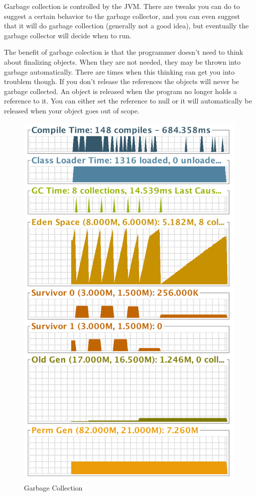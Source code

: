 Garbage collection is controlled by the JVM. There are tweaks you can do to suggest a certain behavior to the garbage collector, and you can even suggest that it will do garbage collection (generally not a good idea), but eventually the garbage collector will decide when to run.

The benefit of garbage colection is that the programmer doesn't need to think about finalizing objects. When they are not needed, they may be thrown into garbage automatically. There are times when this thinking can get you into troublem though. If you don't release the references the objects will never be garbage collected. An object is released when the program no longer holds a reference to it. You can either set the reference to null or it will automatically be released when your object goes out of scope.
\begin{figure}[H]\centering %
\includegraphics[width=\linewidth]{garbage-collection}
\caption{Garbage Collection}
\label{fig:garbage-collection}
\end{figure}
